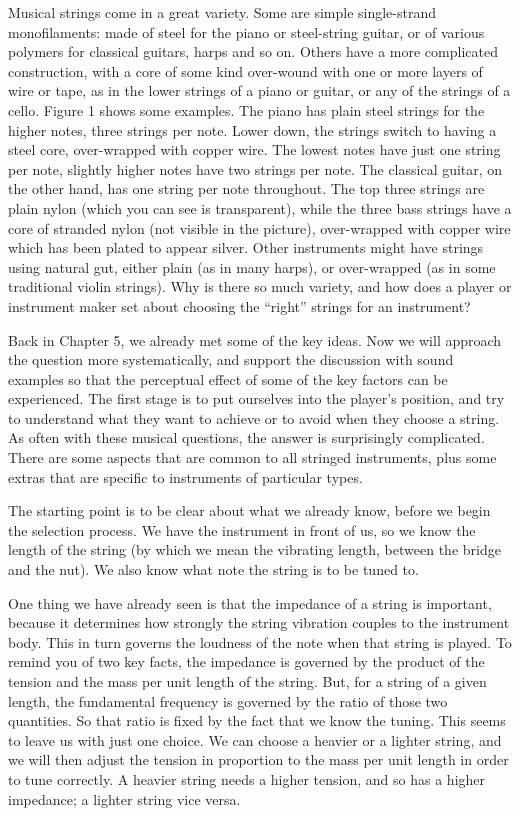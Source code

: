 

  Musical strings come in a great variety. Some are simple single-strand 
  monofilaments: made of steel for the piano or steel-string guitar, or of 
  various polymers for classical guitars, harps and so on. Others have a more 
  complicated construction, with a core of some kind over-wound with one or 
  more layers of wire or tape, as in the lower strings of a piano or guitar, or 
  any of the strings of a cello. Figure 1 shows some examples. The piano has 
  plain steel strings for the higher notes, three strings per note. Lower down, 
  the strings switch to having a steel core, over-wrapped with copper wire. The 
  lowest notes have just one string per note, slightly higher notes have two 
  strings per note. The classical guitar, on the other hand, has one string per 
  note throughout. The top three strings are plain nylon (which you can see is 
  transparent), while the three bass strings have a core of stranded nylon (not 
  visible in the picture), over-wrapped with copper wire which has been plated 
  to appear silver. Other instruments might have strings using natural gut, 
  either plain (as in many harps), or over-wrapped (as in some traditional 
  violin strings). Why is there so much variety, and how does a player or 
  instrument maker set about choosing the “right” strings for an instrument? 

  Back in Chapter 5, we already met some of the key ideas. Now we will approach 
  the question more systematically, and support the discussion with sound 
  examples so that the perceptual effect of some of the key factors can be 
  experienced. The first stage is to put ourselves into the player’s position, 
  and try to understand what they want to achieve or to avoid when they choose 
  a string. As often with these musical questions, the answer is surprisingly 
  complicated. There are some aspects that are common to all stringed 
  instruments, plus some extras that are specific to instruments of particular 
  types. 

  The starting point is to be clear about what we already know, before we begin 
  the selection process. We have the instrument in front of us, so we know the 
  length of the string (by which we mean the vibrating length, between the 
  bridge and the nut). We also know what note the string is to be tuned to. 

  One thing we have already seen is that the impedance of a string is 
  important, because it determines how strongly the string vibration couples to 
  the instrument body. This in turn governs the loudness of the note when that 
  string is played. To remind you of two key facts, the impedance is governed 
  by the product of the tension and the mass per unit length of the string. 
  But, for a string of a given length, the fundamental frequency is governed by 
  the ratio of those two quantities. So that ratio is fixed by the fact that we 
  know the tuning. This seems to leave us with just one choice. We can choose a 
  heavier or a lighter string, and we will then adjust the tension in 
  proportion to the mass per unit length in order to tune correctly. A heavier 
  string needs a higher tension, and so has a higher impedance; a lighter 
  string vice versa. 

